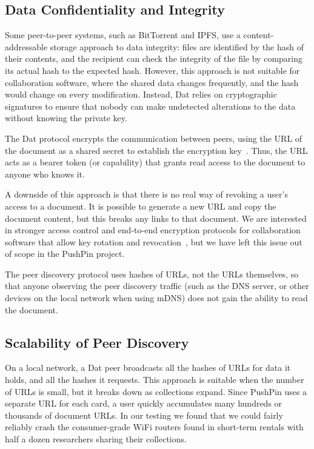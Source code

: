 \documentclass[sigplan,10pt]{acmart}
\begin{document}
\subsection{Data Confidentiality and Integrity}

Some peer-to-peer systems, such as BitTorrent and IPFS, use a content-addressable storage approach to data integrity: files are identified by the hash of their contents, and the recipient can check the integrity of the file by comparing its actual hash to the expected hash. However, this approach is not suitable for collaboration software, where the shared data changes frequently, and the hash would change on every modification. Instead, Dat relies on cryptographic signatures to ensure that nobody can make undetected alterations to the data without knowing the private key.

The Dat protocol encrypts the communication between peers, using the URL of the document as a shared secret to establish the encryption key~\cite{HowDatWorks}.
Thus, the URL acts as a bearer token (or capability) that grants read access to the document to anyone who knows it.

A downside of this approach is that there is no real way of revoking a user's access to a document.
It is possible to generate a new URL and copy the document content, but this breaks any links to that document.
We are interested in stronger access control and end-to-end encryption protocols for collaboration software that allow key rotation and revocation~\cite{Kleppmann:2018tk}, but we have left this issue out of scope in the PushPin project.

The peer discovery protocol uses hashes of URLs, not the URLs themselves, so that anyone observing the peer discovery traffic (such as the DNS server, or other devices on the local network when using mDNS) does not gain the ability to read the document.

\subsection{Scalability of Peer Discovery}

On a local network, a Dat peer broadcasts all the hashes of URLs for data it holds, and all the hashes it requests.
This approach is suitable when the number of URLs is small, but it breaks down as collections expand.
Since PushPin uses a separate URL for each card, a user quickly accumulates many hundreds or thousands of document URLs.
In our testing we found that we could fairly reliably crash the consumer-grade WiFi routers found in short-term rentals with half a dozen researchers sharing their collections.
\end{document}
